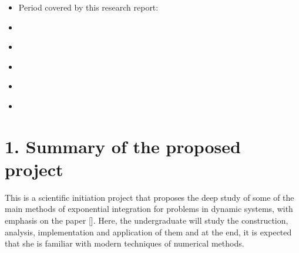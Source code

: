 \documentclass[letterpaper,10pt,english]{jupyterBook}
\begin{document}
\sphinxAtStartPar
{}
\begin{itemize}
\item {} 
\sphinxAtStartPar
Period covered by this research report:

\end{itemize}

\sphinxAtStartPar
{}
\begin{itemize}
\item {} 
\sphinxAtStartPar
{\hyperref[\detokenize{Summary_of_the_proposed_project::doc}]{}}

\item {} 
\sphinxAtStartPar
{\hyperref[\detokenize{Summary_of_the_activities::doc}]{}}

\item {} 
\sphinxAtStartPar
{\hyperref[\detokenize{Project_execution::doc}]{}}

\item {} 
\sphinxAtStartPar
{\hyperref[\detokenize{Description_and_evaluation_of_institutional_support_received_in_the_period::doc}]{}}

\item {} 
\sphinxAtStartPar
{\hyperref[\detokenize{Participation_in_scientific_event,_list_of_publications_and_list_of_papers_prepared_or_submitted::doc}]{}}

\end{itemize}

\sphinxstepscope


\chapter{1. Summary of the proposed project}
\label{\detokenize{Summary_of_the_proposed_project:summary-of-the-proposed-project}}\label{\detokenize{Summary_of_the_proposed_project::doc}}
\sphinxAtStartPar
This is a scientific initiation project that proposes the deep study of some of the main methods
of exponential integration for problems in dynamic systems, with emphasis on the paper {[}{]}.
Here, the undergraduate will study the construction, analysis, implementation and application
of them and at the end, it is expected that she is familiar with modern techniques of numerical
methods.
\end{document}
